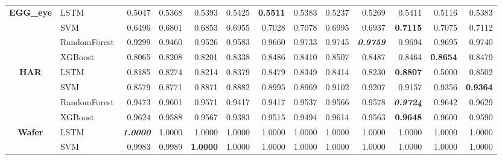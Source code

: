 \begin{table}[H]
\begin{adjustbox}{max width=12cm}
\begin{tabular}{|c|l|r|r|r|r|r|r|r|r|r|r|r|}
			\hline
			\textbf{EGG\_eye}     & LSTM         & 0.5047                   & 0.5368 & 0.5393          & 0.5425 & \textbf{0.5511} & 0.5383 & 0.5237          & 0.5269                   & 0.5411                   & 0.5116          & 0.5383 \\
			                      & SVM          & 0.6496                   & 0.6801 & 0.6853          & 0.6955 & 0.7028          & 0.7078 & 0.6995          & 0.6937                   & \textbf{0.7115}          & 0.7075          & 0.7112 \\
			                      & RandomForest & 0.9299                   & 0.9460 & 0.9526          & 0.9583 & 0.9660          & 0.9733 & 0.9745          & \textit{\textbf{0.9759}} & 0.9694                   & 0.9695          & 0.9740 \\
			                      & XGBoost      & 0.8065                   & 0.8208 & 0.8201          & 0.8338 & 0.8486          & 0.8410 & 0.8507          & 0.8487                   & 0.8464                   & \textbf{0.8654} & 0.8479 \\
			\hline
			\textbf{HAR}          & LSTM         & 0.8185                   & 0.8274 & 0.8214          & 0.8379 & 0.8479          & 0.8349 & 0.8414          & 0.8230                   & \textbf{0.8807}          & 0.5000          & 0.8502 \\
			                      & SVM          & 0.8579                   & 0.8771 & 0.8871          & 0.8882 & 0.8995          & 0.8969 & 0.9102          & 0.9207                   & 0.9157                   & 0.9356          & \textbf{0.9364} \\
			                      & RandomForest & 0.9473                   & 0.9601 & 0.9571          & 0.9417 & 0.9417          & 0.9537 & 0.9566          & 0.9578                   & \textit{\textbf{0.9724}}          & 0.9642          & 0.9629 \\
			                      & XGBoost      & 0.9624                   & 0.9588 & 0.9567          & 0.9383 & 0.9515          & 0.9494 & 0.9614          & 0.9563                   & \textbf{0.9648}                   & 0.9600          & 0.9590 \\
			\hline
			\textbf{Wafer}        & LSTM         & \textit{\textbf{1.0000}}          & 1.0000 & 1.0000          & 1.0000 & 1.0000          & 1.0000 & 1.0000          & 1.0000                   & 1.0000                   & 1.0000          & 1.0000 \\
			                      & SVM          & 0.9983                   & 0.9989 & \textbf{1.0000}          & 1.0000 & 1.0000          & 1.0000 & 1.0000          & 1.0000                   & 1.0000                   & 1.0000          & 1.0000 \\

\end{tabular}
\end{adjustbox}
\end{table}
